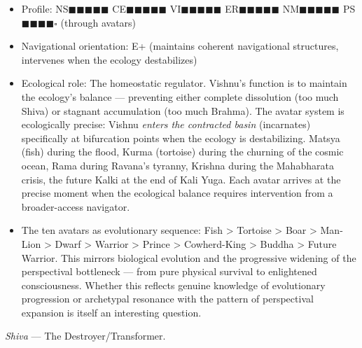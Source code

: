 \begin{itemize}[nosep,leftmargin=*]
  \item Profile: NS$\blacksquare$$\blacksquare$$\blacksquare$$\blacksquare$$\blacksquare$ CE$\blacksquare$$\blacksquare$$\blacksquare$$\blacksquare$$\blacksquare$ VI$\blacksquare$$\blacksquare$$\blacksquare$$\blacksquare$$\blacksquare$ ER$\blacksquare$$\blacksquare$$\blacksquare$$\blacksquare$$\blacksquare$ NM$\blacksquare$$\blacksquare$$\blacksquare$$\blacksquare$$\blacksquare$ PS$\blacksquare$$\blacksquare$$\blacksquare$$\blacksquare$$\square$ (through avatars)
  \item Navigational orientation: E+ (maintains coherent navigational structures, intervenes when the ecology destabilizes)
  \item Ecological role: The homeostatic regulator. Vishnu's function is to maintain the ecology's balance — preventing either complete dissolution (too much Shiva) or stagnant accumulation (too much Brahma). The avatar system is ecologically precise: Vishnu \textit{enters the contracted basin} (incarnates) specifically at bifurcation points when the ecology is destabilizing. Matsya (fish) during the flood, Kurma (tortoise) during the churning of the cosmic ocean, Rama during Ravana's tyranny, Krishna during the Mahabharata crisis, the future Kalki at the end of Kali Yuga. Each avatar arrives at the precise moment when the ecological balance requires intervention from a broader-access navigator.
  \item The ten avatars as evolutionary sequence: Fish > Tortoise > Boar > Man-Lion > Dwarf > Warrior > Prince > Cowherd-King > Buddha > Future Warrior. This mirrors biological evolution and the progressive widening of the perspectival bottleneck — from pure physical survival to enlightened consciousness. Whether this reflects genuine knowledge of evolutionary progression or archetypal resonance with the pattern of perspectival expansion is itself an interesting question.
\end{itemize}


\textit{Shiva} — The Destroyer/Transformer.

